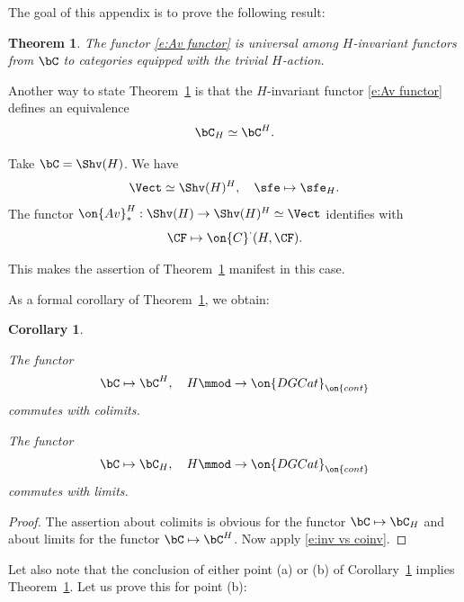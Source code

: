 \documentclass[9pt]{amsart}
\newtheorem{cor}[subsubsection]{Corollary}
\newtheorem{thm}[subsubsection]{Theorem}
\theoremstyle{definition}
\theoremstyle{remark}
\newcommand{\thmref}[1]{Theorem~\ref{#1}}
\newcommand{\corref}[1]{Corollary~\ref{#1}}
\numberwithin{equation}{section}
\begin{document}
The goal of this appendix is to prove the following result:

\begin{thm} \label{t:coinvariants}
The functor \eqref{e:Av functor} is universal among $H$-invariant functors from $\bC$ to categories 
equipped with the \emph{trivial} $H$-action. 
\end{thm}

Another way to state \thmref{t:coinvariants} is that the $H$-invariant functor \eqref{e:Av functor}
defines an equivalence 
\begin{equation} \label{e:inv vs coinv}
\bC_H\simeq \bC^H. 
\end{equation}

  \label{sss:H reg}

Take $\bC=\Shv(H)$. We have
$$\Vect\simeq \Shv(H)^H, \quad \sfe\mapsto \sfe_H.$$
The functor $\on{Av}^H_*: \Shv(H)\to \Shv(H)^H\simeq \Vect$ identifies with
$$\CF\mapsto \on{C}^\cdot(H,\CF).$$

This makes the assertion of  \thmref{t:coinvariants} manifest in this case.

\sssec{}

As a formal corollary of \thmref{t:coinvariants}, we obtain:

\begin{cor} \label{c:inv and colimits}  \hfill

\smallskip

The functor 
$$\bC\mapsto \bC^H, \quad H\mmod\to \on{DGCat}_{\on{cont}}$$ commutes
with colimits.

\smallskip

  The functor
$$\bC\mapsto \bC_H, \quad H\mmod\to \on{DGCat}_{\on{cont}}$$ commutes
with limits.
\end{cor}

\begin{proof}
The assertion about colimits is obvious for the functor $\bC\mapsto \bC_H$ and about limits for the functor $\bC\mapsto \bC^H$.
Now apply \eqref{e:inv vs coinv}.
\end{proof}

\sssec{}  \label{sss:limits enough}

Let also note that the conclusion of either point (a) or (b) of \corref{c:inv and colimits} implies \thmref{t:coinvariants}.
Let us prove this for point (b):
\end{document}
